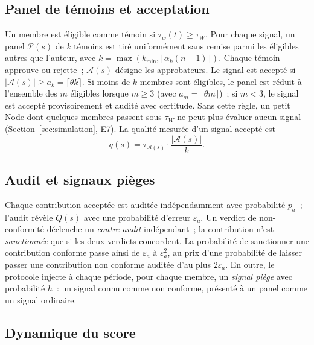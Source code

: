 \documentclass[11pt,a4paper]{article}
\theoremstyle{plain}
\theoremstyle{definition}
\theoremstyle{remark}
\newcommand{\1}{\mathbf{1}}
\begin{document}
\subsection{Panel de témoins et acceptation}

Un membre est éligible comme témoin si $\tau_w(t)\ge\tau_W$. Pour chaque signal,
un panel $\mathcal{P}(s)$ de $k$ témoins est tiré uniformément sans remise
parmi les éligibles autres que l'auteur, avec
$k=\max(k_{\min},\lfloor\alpha_k(n-1)\rfloor)$. Chaque témoin approuve ou
rejette~; $\mathcal{A}(s)$ désigne les approbateurs. Le signal est accepté si
$|\mathcal{A}(s)|\ge a_k=\lceil\theta k\rceil$. Si moins de $k$ membres sont
éligibles, le panel est réduit à l'ensemble des $m$ éligibles lorsque $m\ge3$
(avec $a_m=\lceil\theta m\rceil$)~; si $m<3$, le signal est accepté
provisoirement et audité avec certitude. Sans cette règle, un petit Node dont
quelques membres passent sous $\tau_W$ ne peut plus évaluer aucun signal
(Section~\ref{sec:simulation}, E7). La qualité mesurée d'un signal accepté est
\begin{equation}
q(s)=\bar\tau_{\mathcal{A}(s)}\cdot\frac{|\mathcal{A}(s)|}{k}.
\label{eq:q}
\end{equation}

\subsection{Audit et signaux pièges}

Chaque contribution acceptée est auditée indépendamment avec probabilité
$p_a$~; l'audit révèle $Q(s)$ avec une probabilité d'erreur $\varepsilon_a$.
Un verdict de non-conformité déclenche un \emph{contre-audit} indépendant~; la
contribution n'est \emph{sanctionnée} que si les deux verdicts concordent. La
probabilité de sanctionner une contribution conforme passe ainsi de
$\varepsilon_a$ à $\varepsilon_a^2$, au prix d'une probabilité de laisser passer
une contribution non conforme auditée d'au plus $2\varepsilon_a$. En outre, le protocole injecte à chaque
période, pour chaque membre, un \emph{signal piège} avec probabilité $h$~: un
signal connu comme non conforme, présenté à un panel comme un signal ordinaire.

\subsection{Dynamique du score}
\end{document}
